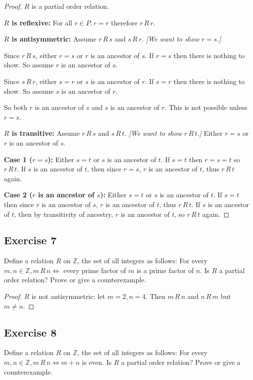 \documentclass[14pt]{extarticle}
\newcommand{\Z}{\mathbb{Z}}
\begin{document}
\begin{proof}
        $R$ is a partial order relation.

                {\bf $R$ is reflexive:} For all \(r \in P, r = r\) therefore \(r \,R\, r\).

                {\bf $R$ is antisymmetric:} Assume \(r \,R\, s\) and \(s \,R\, r\). {\it [We want to show \(r = s\).]}

        Since \(r \,R\, s\), either \(r=s\) or $r$ is an ancestor of $s$. If \(r=s\) then there is nothing to show. So assume
        $r$ is an ancestor of $s$.

        Since \(s \,R\, r\), either \(s=r\) or $s$ is an ancestor of $r$. If $s=r$ then there is nothing to show. So assume
        $s$ is an ancestor of $r$.

        So both $r$ is an ancestor of $s$ and $s$ is an ancestor of $r$. This is not possible unless \(r=s\).

                {\bf $R$ is transitive:} Assume \(r \,R\, s\) and \(s \,R\, t\). {\it [We want to show \(r \,R\, t\).]} Either $r=s$ or
        $r$ is an ancestor of $s$.

                {\bf Case 1 (\(r=s\)):} Either $s=t$ or $s$ is an ancestor of $t$. If $s=t$ then $r=s=t$ so \(r \,R\, t\). If $s$ is
        an ancestor of $t$, then since $r=s$, $r$ is an ancestor of $t$, thus \(r \,R\, t\) again.

                {\bf Case 2 ($r$ is an ancestor of $s$):} Either $s=t$ or $s$ is an ancestor of $t$. If $s=t$ then since $r$ is an
        ancestor of $s$, $r$ is an ancestor of $t$, thus \(r \,R\, t\). If $s$ is an ancestor of $t$, then by transitivity of
        ancestry, $r$ is an ancestor of $t$, so \(r \,R\, t\) again.
\end{proof}

\subsection{Exercise 7}
Define a relation $R$ on $\Z$, the set of all integers as follows: For every \(m, n \in \Z, m \,R\, n \iff\) every
prime factor of $m$ is a prime factor of $n$. Is $R$ a partial order relation? Prove or give a counterexample.

\begin{proof}
        $R$ is not antisymmetric: let \(m = 2, n = 4\). Then \(m \,R\, n\) and \(n \,R\, m\) but \(m \neq n\).
\end{proof}

\subsection{Exercise 8}
Define a relation $R$ on $\Z$, the set of all integers as follows: For every \(m, n \in \Z, m \,R\, n \iff m + n\)
is even. Is $R$ a partial order relation? Prove or give a counterexample.
\end{document}
